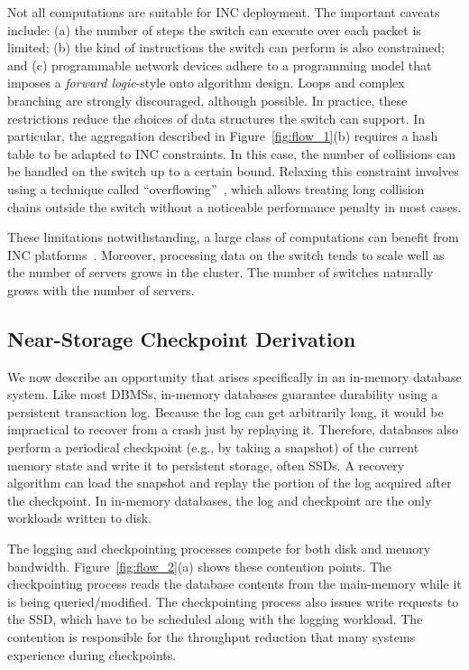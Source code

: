 \documentclass[11pt,dvipdfmx]{article}
\begin{document}
Not all computations are suitable for INC deployment.
The important caveats include: (a) the number of steps the switch can execute
over each packet is limited; (b) the kind of instructions the switch can perform
is also constrained; and (c) programmable network devices adhere to a
programming model that imposes a \emph{forward logic}-style onto algorithm
design.
Loops and complex branching are strongly discouraged, although possible.
In practice, these restrictions reduce the choices of data structures the switch
can support.
In particular, the aggregation described in Figure~\ref{fig:flow_1}(b) requires
a hash table to be adapted to INC constraints.
In this case, the number of collisions can be handled on the switch up to a
certain bound.
Relaxing this constraint involves using a technique called
``overflowing''~\cite{lerner19}, which allows treating long collision chains
outside the switch without a noticeable performance penalty in most cases.

These limitations notwithstanding, a large class of computations can benefit from
INC platforms~\cite{ports19}.
Moreover, processing data on the switch tends to scale well as the number of
servers grows in the cluster.
The number of switches naturally grows with the number of servers.


\subsection{Near-Storage Checkpoint Derivation}
\label{ssec:cp_derivation}

We now describe an opportunity that arises specifically in an in-memory database
system.
Like most DBMSs, in-memory databases guarantee durability using a persistent
transaction log.
Because the log can get arbitrarily long, it would be impractical to recover
from a crash just by replaying it.
Therefore, databases also perform a periodical checkpoint (e.g., by taking a
snapshot) of the current memory state and write it to persistent storage, often
SSDs.
A recovery algorithm can load the snapshot and replay the portion of the log
acquired after the checkpoint.
In in-memory databases, the log and checkpoint are the only workloads written to
disk.


The logging and checkpointing processes compete for both disk and memory
bandwidth.
Figure~\ref{fig:flow_2}(a) shows these contention points.
The checkpointing process reads the database contents from the main-memory while
it is being queried/modified.
The checkpointing process also issues write requests to the SSD, which have to
be scheduled along with the logging workload.
The contention is responsible for the throughput reduction that many systems
experience during checkpoints.
\end{document}
